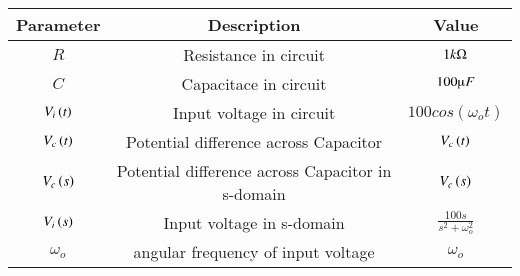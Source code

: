 \begin{tabular}{|c|c|c|}
    \hline
    \textbf{Parameter} & \textbf{Description} & \textbf{Value} \\
    \hline
    $R$ & Resistance in circuit & $ 1k\ohm$ \\
    \hline
    $C$ & Capacitace in circuit & $ 100\micro F$ \\
    \hline
    $V_i\left(t\right)$ & Input voltage in circuit & $ 100cos(\omega_o t)$ \\
    \hline
    $V_c\left(t\right)$ & Potential difference across Capacitor& $V_c\left(t\right)$ \\
    \hline
    $V_c\left(s\right)$ & Potential difference across Capacitor in s-domain& $V_c\left(s\right)$ \\
    \hline
    $V_i\left(s\right)$ & Input voltage in s-domain& $ \frac{100s}{s^2+ \omega_o^2}$\\
    \hline
    $\omega_o$ & angular frequency of input voltage& $ \omega_o$\\
    \hline
\end{tabular}




